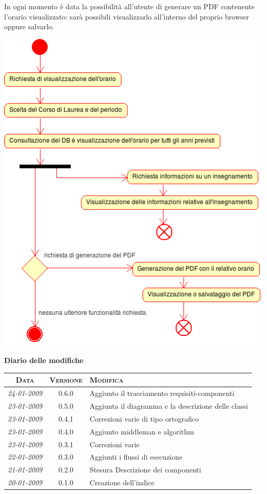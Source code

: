 \documentclass[11pt,a4paper]{article}
\newcommand{\modifiche} 
{
\newpage
\begin{center}
\textbf{Diario delle modifiche} \\
\bigskip
\begin{tabular}{|c|c|p{0.62\textwidth}|}
\hline
\textsc{Data} & \textsc{Versione} & \textsc{Modifica} \\
\hline
\hline
\textit{24-01-2009} & 0.6.0 & Aggiunto il tracciamento requisiti-componenti \\
\hline
\textit{23-01-2009} & 0.5.0 & Aggiunta il diagramma e la descrizione delle classi \\
\hline
\textit{23-01-2009} & 0.4.1 & Correzioni varie di tipo ortografico\\
\hline
\textit{23-01-2009} & 0.4.0 & Aggiunto middleman e algorithm \\
\hline
\textit{23-01-2009} & 0.3.1 & Correzioni varie \\
\hline
\textit{22-01-2009} & 0.3.0 & Aggiunti i flussi di esecuzione \\
\hline
\textit{21-01-2009} & 0.2.0 & Stesura Descrizione dei componenti \\
\hline
\textit{20-01-2009} & 0.1.0 & Creazione dell'indice \\
\hline
\end{tabular}
\end{center}
}
\begin{document}
In ogni momento è data la possibilità all'utente di generare un PDF contenente l'orario visualizzato: sarà possibili visualizzarlo all'interno del proprio browser oppure salvarlo.
\begin{center}
 \includegraphics[scale=0.85]{images/consultazione_orario.png}
\end{center}

\modifiche
\end{document}
